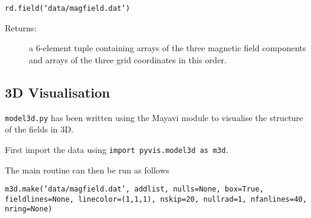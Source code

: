 \documentclass[12pt]{article}
\begin{document}
      \texttt{rd.field(`data/magfield.dat')}

      \begin{description}
        \item [Returns:] a 6-element tuple containing arrays of the three magnetic field components and arrays of the three grid coordinates in this order.
      \end{description}

    \subsection{3D Visualisation}

      \texttt{model3d.py} has been written using the Mayavi module to visualise the structure of the fields in 3D.

      First import the data using \texttt{import pyvis.model3d as m3d}.

      The main routine can then be run as follows

      \texttt{m3d.make(`data/magfield.dat', addlist, nulls=None, box=True, fieldlines=None, linecolor=(1,1,1), nskip=20, nullrad=1, nfanlines=40, nring=None)}
\end{document}
